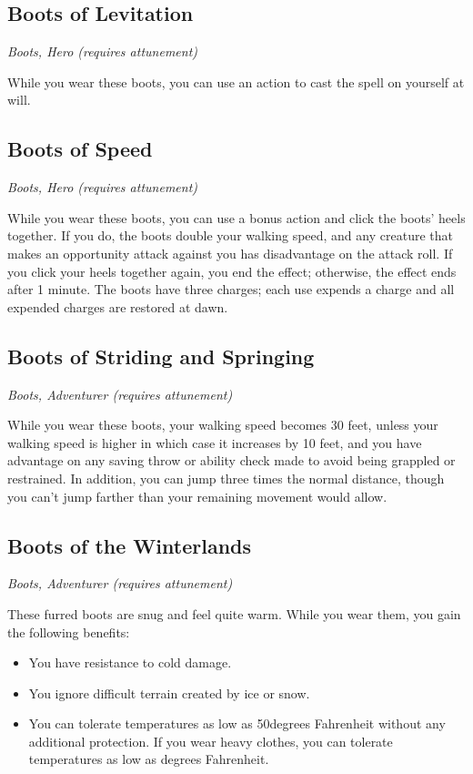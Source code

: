 \subsection{Boots of Levitation}
\textit{Boots, Hero (requires attunement)}

While you wear these boots, you can use an action to cast the  spell on yourself at will.

\subsection{Boots of Speed}
\textit{Boots, Hero (requires attunement)}

While you wear these boots, you can use a bonus action and click the boots' heels together. If you do, the boots double your walking speed, and any creature that makes an opportunity attack against you has disadvantage on the attack roll. If you click your heels together again, you end the effect; otherwise, the effect ends after 1 minute. The boots have three charges; each use expends a charge and all expended charges are restored at dawn.

\subsection{Boots of Striding and Springing}
\textit{Boots, Adventurer (requires attunement)} 

While you wear these boots, your walking speed becomes 30 feet, unless your walking speed is higher in which case it increases by 10 feet, and you have advantage on any saving throw or ability check made to avoid being grappled or restrained. In addition, you can jump three times the normal distance, though you can't jump farther than your remaining movement would allow.

\subsection{Boots of the Winterlands}
\textit{Boots, Adventurer (requires attunement)}

These furred boots are snug and feel quite warm. While you wear them, you gain the following benefits:
\begin{itemize}
 \item You have resistance to cold damage.
 \item You ignore difficult terrain created by ice or snow.
 \item You can tolerate temperatures as low as \textminus50degrees Fahrenheit without any additional protection. If you wear heavy clothes, you can tolerate temperatures as low as  degrees Fahrenheit.
\end{itemize}

